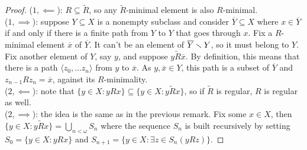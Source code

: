 \documentclass[twoside,openright,titlepage,numbers=noenddot,%
               headinclude,footinclude,cleardoublepage=empty,abstract=on,
               BCOR=23mm,paper=letter,fontsize=11pt
               ]{scrreprt}
\begin{document}
\begin{proof}
    ($1, \impliedby$): $R \subseteq \tilde{R}$, so any $\tilde{R}$-minimal element is also $R$-minimal. \\
    ($1, \implies$): suppose $Y \subseteq X$ is a nonempty subclass and consider $\overline{Y} \subseteq X$ where $x \in \overline{Y}$ if and only if there is a finite path from $Y$ to $Y$ that goes through $x$. Fix a $R$-minimal element $\overline{x}$ of $\overline{Y}$. It can't be an element of $\overline{Y} \smallsetminus Y$, so it must belong to $Y$. Fix another element of $Y$, say $y$, and suppose $y \tilde{R} \overline{x}$. By definition, this means that there is a path $\langle z_0, \dots z_n \rangle$ from $y$ to $\overline{x}$. As $y, \overline{x} \in Y$, this path is a subset of $\overline{Y}$ and $z_{n-1} R z_n = \overline{x}$, against its $R$-minimality. \\
    ($2, \impliedby$): note that $\{y \in X: y R x\} \subseteq \{y \in X: y \tilde{R} x\}$, so if $\tilde{R}$ is regular, $R$ is regular as well. \\
    ($2, \implies$): the idea is the same as in the previous remark. Fix some $x \in X$, then $\{y \in X: y \tilde{R} x\} = \bigcup_{n < \omega} S_n$ where the sequence $S_n$ is built recursively by setting $S_0 = \{y \in X: y R x\}$ and $S_{n+1} = \{y \in X: \exists z \in S_n (y R z)\}$.
\end{proof}
\end{document}
